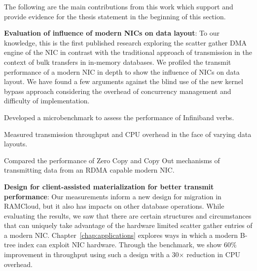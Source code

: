 The following are the main contributions from this work which support and provide
evidence for the thesis statement in the beginning of this section.

\begin{myitemize}

  \item{\textbf{Evaluation of influence of modern NICs on data layout}}: To our knowledge,
   this is the first published research exploring the scatter gather DMA engine of the NIC 
   in contrast with the traditional approach of transmission in the context of bulk transfers in in-memory databases. 
   We profiled the transmit performance of a modern NIC in depth to show the influence of NICs on data layout. 
   We have found a few arguments against the blind use of the new kernel bypass approach considering
   the overhead of concurrency management and difficulty of implementation.
   \begin{myitemize}

    \item Developed a microbenchmark to assess the performance of Infiniband verbs.

    \item Measured transmission throughput and CPU overhead in the face of varying
    data layouts.

    \item Compared the performance of Zero Copy and Copy Out mechanisms of \linebreak
    transmitting data from an RDMA capable modern NIC.
   \end{myitemize} 

    \item{\textbf{Design for client-assisted materialization for better transmit performance}}: Our measurements inform a new design for migration in RAMCloud, but it also has impacts on other database operations.
     While evaluating the results, we saw that there are certain structures and circumstances that can uniquely take advantage of the hardware limited scatter gather entries of a modern NIC.
     Chapter~\ref{chap:applications} explores ways in which a modern B-tree index can exploit NIC hardware.
     Through the benchmark, we show 60\% improvement in throughput using such a design with a 30$\times$ reduction in CPU overhead.



\end{myitemize}
